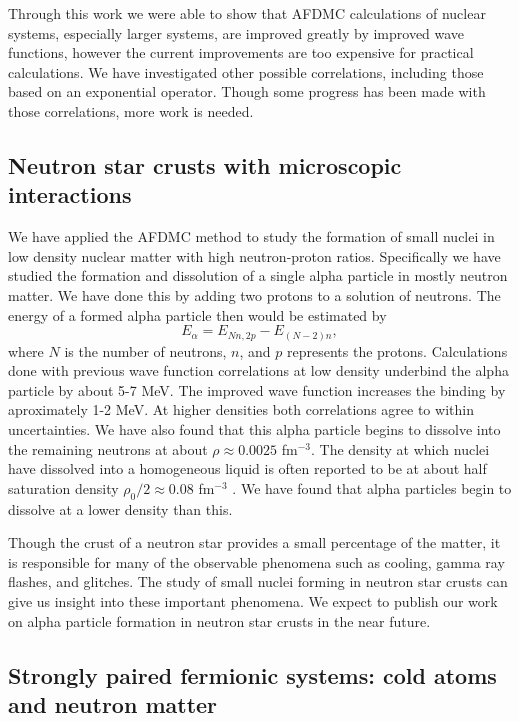 \documentclass[12pt,letterpaper]{article}
\begin{document}
Through this work we were able to show that AFDMC calculations of nuclear systems, especially larger systems, are improved greatly by improved wave functions, however the current improvements are too expensive for practical calculations. We have investigated other possible correlations, including those based on an exponential operator. Though some progress has been made with those correlations, more work is needed.

\subsection{Neutron star crusts with microscopic interactions}
We have applied the AFDMC method to study the formation of small nuclei in low density nuclear matter with high neutron-proton ratios. Specifically we have studied the formation and dissolution of a single alpha particle in mostly neutron matter. We have done this by adding two protons to a solution of neutrons. The energy of a formed alpha particle then would be estimated by
\begin{equation}
   E_\alpha = E_{Nn,2p} - E_{(N-2)n},
\end{equation}
where $N$ is the number of neutrons, $n$, and $p$ represents the protons. Calculations done with previous wave function correlations at low density underbind the alpha particle by about 5-7 MeV. The improved wave function increases the binding by aproximately 1-2 MeV. At higher densities both correlations agree to within uncertainties. We have also found that this alpha particle begins to dissolve into the remaining neutrons at about $\rho\approx0.0025$ fm$^{-3}$. The density at which nuclei have dissolved into a homogeneous liquid is often reported to be at about half saturation density $\rho_0/2 \approx 0.08$ fm$^{-3}$ \cite{cha15}. We have found that alpha particles begin to dissolve at a lower density than this.

Though the crust of a neutron star provides a small percentage of the matter, it is responsible for many of the observable phenomena such as cooling, gamma ray flashes, and glitches. The study of small nuclei forming in neutron star crusts can give us insight into these important phenomena. We expect to publish our work on alpha particle formation in neutron star crusts in the near future.

\subsection{Strongly paired fermionic systems: cold atoms and neutron matter}
\end{document}
